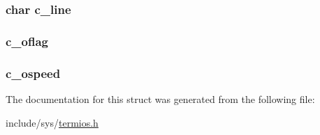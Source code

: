 \hypertarget{structtermios_a4f3a2260ca7ad16657ba7de6cac4a146}{
\subsubsection[{c\-\_\-line}]{\setlength{\rightskip}{0pt plus 5cm}char {\bf c\-\_\-line}}}\label{structtermios_a4f3a2260ca7ad16657ba7de6cac4a146}
\hypertarget{structtermios_a615efcbde1bbfd1f2c28b3a62bd05add}{
\subsubsection[{c\-\_\-oflag}]{ {\bf c\-\_\-oflag}}}\label{structtermios_a615efcbde1bbfd1f2c28b3a62bd05add}
\hypertarget{structtermios_af5ea2ab180c38bf961799a84ff8bde67}{
\subsubsection[{c\-\_\-ospeed}]{ {\bf c\-\_\-ospeed}}}\label{structtermios_af5ea2ab180c38bf961799a84ff8bde67}


\-The documentation for this struct was generated from the following file\-:\begin{DoxyCompactItemize}
\item 
include/sys/\hyperlink{termios_8h}{termios.\-h}\end{DoxyCompactItemize}
